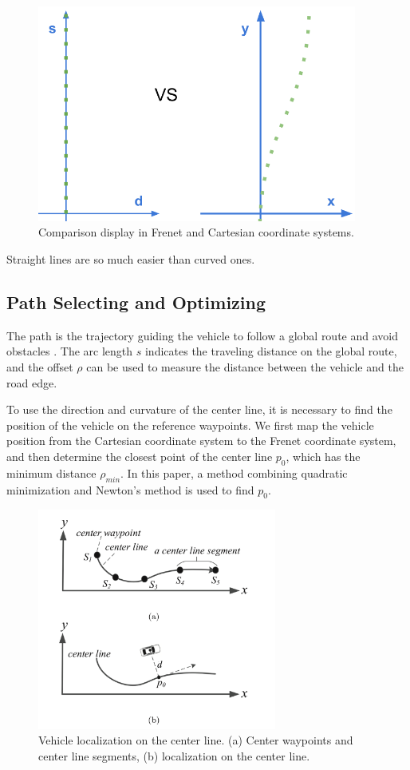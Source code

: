 \begin{figure}[h]
\centering
\includegraphics[height=2.8in]{figs/ch3/frenet-final}
\caption{Comparison display in Frenet and Cartesian coordinate systems.}
\label{fig:frenet-final}
\end{figure}

Straight lines are so much easier than curved ones.

\subsection{Path Selecting and Optimizing}

The path is the trajectory guiding the vehicle to follow a global route and avoid obstacles \cite{Trajectory2012}. The arc length $s$ indicates the traveling distance on the global route, and the offset $\rho$ can be used to measure the distance between the vehicle and the road edge.

To use the direction and curvature of the center line, it is necessary to find the position of the vehicle on the reference waypoints. We first map the vehicle position from the Cartesian coordinate system to the Frenet coordinate system, and then determine the closest point of the center line $p_0$, which has the minimum distance $\rho_{min}$. In this paper, a method combining quadratic minimization and Newton's method is used to find $p_0$.

\begin{figure}[h]
\centering
\includegraphics[width=0.7\textwidth]{figs/ch3/location-on-center-line}
\caption{Vehicle localization on the center line. (a) Center waypoints and center line segments, (b) localization on the center line.}
\label{fig:loc-line}
\end{figure}

